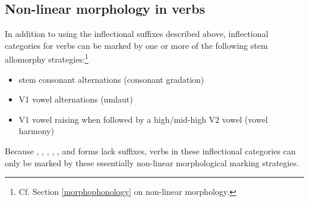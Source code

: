 \subsection{Non-linear morphology in verbs}\label{nonLinearMorphVerbs}
In addition to using the inflectional suffixes described above, inflectional categories for verbs can be marked %
by one or more of the following stem allomorphy strategies:\footnote{Cf. Section \ref{morphophonology} on non-linear morphology.} %
\begin{itemize}
\item{stem consonant alternations (consonant gradation)}
\item{V1 vowel alternations (umlaut)}
\item{V1 vowel raising when followed by a high/mid-high V2 vowel (vowel harmony)}
\end{itemize}
Because , , , , ,  and  forms lack suffixes, verbs in these inflectional categories can only be marked by these essentially non-linear morphological marking strategies. 

